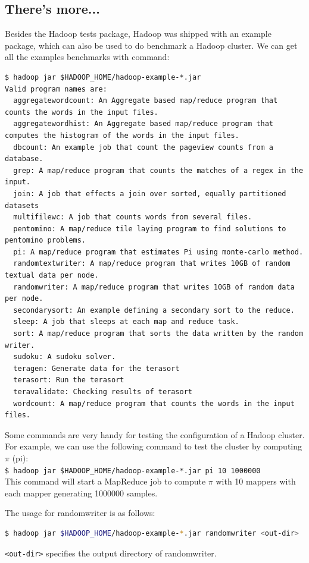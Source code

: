 \subsection*{There's more...}
Besides the Hadoop tests package, Hadoop was shipped with an example package, which can also be used to do benchmark a Hadoop cluster. We can get all the examples benchmarks with command:
\lstset{style=bashstyle}
\begin{lstlisting}
$ hadoop jar $HADOOP_HOME/hadoop-example-*.jar
Valid program names are:
  aggregatewordcount: An Aggregate based map/reduce program that counts the words in the input files.
  aggregatewordhist: An Aggregate based map/reduce program that computes the histogram of the words in the input files.
  dbcount: An example job that count the pageview counts from a database.
  grep: A map/reduce program that counts the matches of a regex in the input.
  join: A job that effects a join over sorted, equally partitioned datasets
  multifilewc: A job that counts words from several files.
  pentomino: A map/reduce tile laying program to find solutions to pentomino problems.
  pi: A map/reduce program that estimates Pi using monte-carlo method.
  randomtextwriter: A map/reduce program that writes 10GB of random textual data per node.
  randomwriter: A map/reduce program that writes 10GB of random data per node.
  secondarysort: An example defining a secondary sort to the reduce.
  sleep: A job that sleeps at each map and reduce task.
  sort: A map/reduce program that sorts the data written by the random writer.
  sudoku: A sudoku solver.
  teragen: Generate data for the terasort
  terasort: Run the terasort
  teravalidate: Checking results of terasort
  wordcount: A map/reduce program that counts the words in the input files.
\end{lstlisting}

Some commands are very handy for testing the configuration of a Hadoop cluster. For example, we can use the following command to test the cluster by computing $\pi$ (pi): \\
\verb|$ hadoop jar $HADOOP_HOME/hadoop-example-*.jar pi 10 1000000| \\
This command will start a MapReduce job to compute $\pi$ with 10 mappers with each mapper generating 1000000 samples.

The usage for randomwriter is as follows:
\lstset{style=bashstyle}
\begin{lstlisting}[language=bash]
$ hadoop jar $HADOOP_HOME/hadoop-example-*.jar randomwriter <out-dir>
\end{lstlisting}
\verb|<out-dir>| specifies the output directory of randomwriter.

